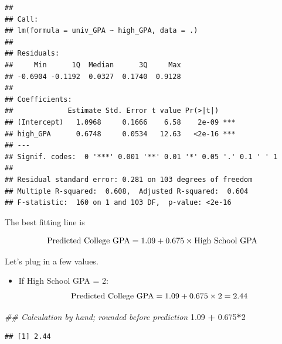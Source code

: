 \documentclass[]{book}
\newenvironment{Shaded}{\begin{snugshade}}{\end{snugshade}}
\newcommand{\CommentTok}[1]{\textcolor[rgb]{0.56,0.35,0.01}{\textit{#1}}}
\newcommand{\DataTypeTok}[1]{\textcolor[rgb]{0.13,0.29,0.53}{#1}}
\newcommand{\DecValTok}[1]{\textcolor[rgb]{0.00,0.00,0.81}{#1}}
\newcommand{\FloatTok}[1]{\textcolor[rgb]{0.00,0.00,0.81}{#1}}
\newcommand{\KeywordTok}[1]{\textcolor[rgb]{0.13,0.29,0.53}{\textbf{#1}}}
\newcommand{\NormalTok}[1]{#1}
\newcommand{\OperatorTok}[1]{\textcolor[rgb]{0.81,0.36,0.00}{\textbf{#1}}}
\newcommand{\StringTok}[1]{\textcolor[rgb]{0.31,0.60,0.02}{#1}}
\providecommand{\tightlist}{%
  \setlength{\itemsep}{0pt}\setlength{\parskip}{0pt}}
\begin{document}
\begin{verbatim}
## 
## Call:
## lm(formula = univ_GPA ~ high_GPA, data = .)
## 
## Residuals:
##     Min      1Q  Median      3Q     Max 
## -0.6904 -0.1192  0.0327  0.1740  0.9128 
## 
## Coefficients:
##             Estimate Std. Error t value Pr(>|t|)    
## (Intercept)   1.0968     0.1666    6.58    2e-09 ***
## high_GPA      0.6748     0.0534   12.63   <2e-16 ***
## ---
## Signif. codes:  0 '***' 0.001 '**' 0.01 '*' 0.05 '.' 0.1 ' ' 1
## 
## Residual standard error: 0.281 on 103 degrees of freedom
## Multiple R-squared:  0.608,  Adjusted R-squared:  0.604 
## F-statistic:  160 on 1 and 103 DF,  p-value: <2e-16
\end{verbatim}

The best fitting line is

\[ \hbox{Predicted College GPA} = 1.09 + 0.675 \times \hbox{High School GPA} \]

Let's plug in a few values.

\begin{itemize}
\tightlist
\item
  If High School GPA = 2:\\
  \[ \hbox{Predicted College GPA} = 1.09 + 0.675 \times 2 = 2.44 \]
\end{itemize}

\begin{Shaded}
\begin{Highlighting}[]
\CommentTok{## Calculation by hand; rounded before prediction}
\FloatTok{1.09} \OperatorTok{+}\StringTok{ }\FloatTok{0.675}\OperatorTok{*}\DecValTok{2}
\end{Highlighting}
\end{Shaded}

\begin{verbatim}
## [1] 2.44
\end{verbatim}

\begin{Shaded}
\end{Shaded}
\end{document}
